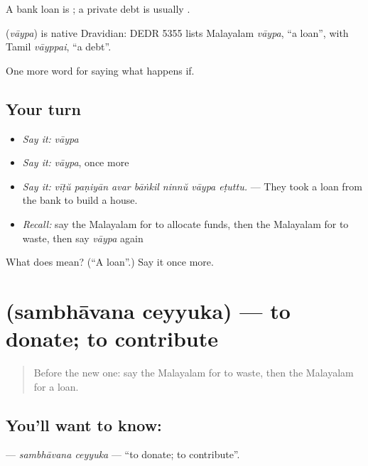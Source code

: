 A bank loan is ; a private debt is usually .

\begin{cousinweb}
\textbf{} (\emph{vāypa}) is native Dravidian: DEDR 5355 lists Malayalam \emph{vāypa}, \textquotedblleft{}a loan\textquotedblright{}, with Tamil \emph{vāyppai}, \textquotedblleft{}a debt\textquotedblright{}.
\end{cousinweb}

\begin{grammarlens}[title={What you've built}]
One more word for saying what happens if.
\end{grammarlens}

\subsection*{Your turn}
\begin{itemize}
\raggedright
  \item \emph{Say it:} \emph{vāypa}
  \item \emph{Say it:} \emph{vāypa}, once more
  \item \emph{Say it:} \emph{vīṭŭ paṇiyān avar bāṅkil ninnŭ vāypa eṭuttu.} — They took a loan from the bank to build a house.
  \item \emph{Recall:} say the Malayalam for to allocate funds, then the Malayalam for to waste, then say \emph{vāypa} again
\end{itemize}

\begin{tcolorbox}[breakable,colback=teal!4,colframe=teal!35!black,title={Before you move on}]
What does  mean? (\textquotedblleft{}A loan\textquotedblright{}.) Say it once more.
\end{tcolorbox}
\section[\texorpdfstring{\ml{സംഭാവന} \ml{ചെയ്യുക} (sambhāvana ceyyuka)}{സംഭാവന ചെയ്യുക (sambhāvana ceyyuka)}]{  (sambhāvana ceyyuka) — to donate; to contribute}

\label{lesson:ML-C458-sambhavana-ceyyuka}



\begin{quote}
Before the new one: say the Malayalam for to waste, then the Malayalam for a loan.
\end{quote}

\subsection*{You'll want to know:  }
\textbf{ } — \emph{sambhāvana ceyyuka} — \textquotedblleft{}to donate; to contribute\textquotedblright{}.


